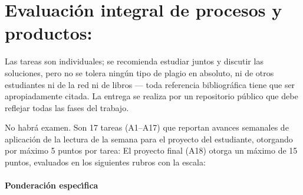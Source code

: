 \section{Evaluaci\'{o}n integral de procesos y productos:}

Las tareas son individuales; se recomienda estudiar juntos y discutir
las soluciones, pero no se tolera ning\'{u}n tipo de plagio en
absoluto, ni de otros estudiantes ni de la red ni de libros --- toda
referencia bibliogr\'{a}fica tiene que ser apropiadamente citada. La
entrega se realiza por un repositorio p\'{u}blico que debe reflejar todas
las fases del trabajo. 

No habr\'{a} examen.  Son 17 tareas (A1--A17) que reportan avances
semanales de aplicaci\'{o}n de la lectura de la semana para el
proyecto del estudiante, otorgando por m\'{a}ximo 5 puntos por
tarea:  El proyecto final (A18) otorga un
m\'{a}ximo de 15 puntos, evaluados en los siguientes
rubros  con la escala: 

\paragraph{Ponderaci\'{o}n espec\'{\i}fica}

\quad

  
